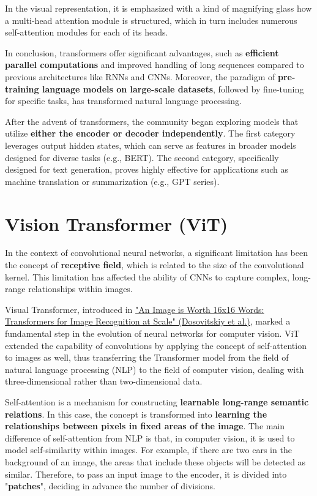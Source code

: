 In the visual representation, it is emphasized with a kind of magnifying glass how a multi-head attention module is structured, which in turn includes numerous self-attention modules for each of its heads.

In conclusion, transformers offer significant advantages, such as \textbf{efficient parallel computations} and improved handling of long sequences compared to previous architectures like RNNs and CNNs. Moreover, the paradigm of \textbf{pre-training language models on large-scale datasets}, followed by fine-tuning for specific tasks, has transformed natural language processing.

After the advent of transformers, the community began exploring models that utilize \textbf{either the encoder or decoder independently}. The first category leverages output hidden states, which can serve as features in broader models designed for diverse tasks (e.g., BERT). The second category, specifically designed for text generation, proves highly effective for applications such as machine translation or summarization (e.g., GPT series).

\section{Vision Transformer (ViT)}


In the context of convolutional neural networks, a significant limitation has been the concept of \textbf{receptive field}, which is related to the size of the convolutional kernel. This limitation has affected the ability of CNNs to capture complex, long-range relationships within images.

Visual Transformer, introduced in \href{https://arxiv.org/pdf/2010.11929}{"An Image is Worth 16x16 Words: Transformers for Image Recognition at Scale" (Dosovitskiy et al.)}, marked a fundamental step in the evolution of neural networks for computer vision. ViT extended the capability of convolutions by applying the concept of self-attention to images as well, thus transferring the Transformer model from the field of natural language processing (NLP) to the field of computer vision, dealing with three-dimensional rather than two-dimensional data.

Self-attention is a mechanism for constructing \textbf{learnable long-range semantic relations}. In this case, the concept is transformed into \textbf{learning the relationships between pixels in fixed areas of the image}. The main difference of self-attention from NLP is that, in computer vision, it is used to model self-similarity within images. For example, if there are two cars in the background of an image, the areas that include these objects will be detected as similar. Therefore, to pass an input image to the encoder, it is divided into "\textbf{patches}", deciding in advance the number of divisions.

